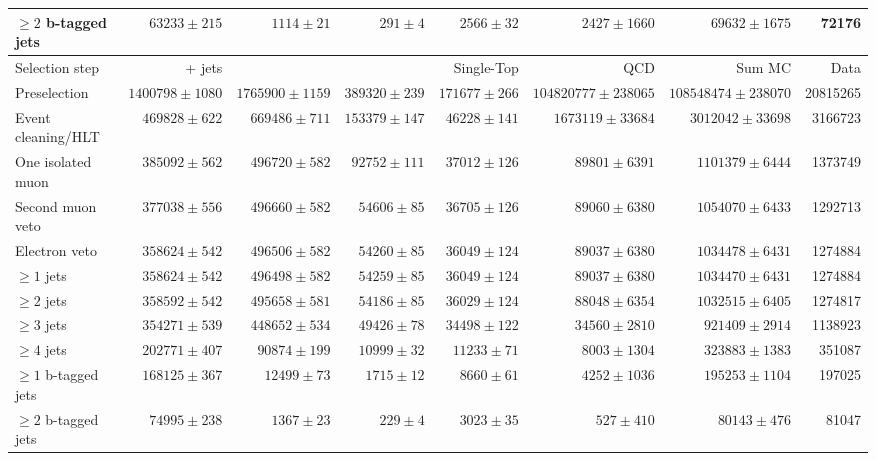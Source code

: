\begin{table}
{\begin{tabular}{lrrrrrrr}
	$\geq 2$ b-tagged jets  &  $63233 \pm 215$ &  $1114 \pm 21$ &  $291 \pm 4$ &  $2566 \pm 32$ &  $2427 \pm 1660$ &  $69632 \pm 1675$ &  72176 \\ 
	\hline
	\hline
	Selection step & \ttbar + jets & \WpJets & \ZpJets & Single-Top & QCD & Sum MC & Data \\
	\hline
	Preselection  &  $1400798 \pm 1080$ &  $1765900 \pm 1159$ &  $389320 \pm 239$ &  $171677 \pm 266$ &  $104820777 \pm 238065$ &  $108548474 \pm 238070$ &  20815265 \\ 
	Event cleaning/HLT  &  $469828 \pm 622$ &  $669486 \pm 711$ &  $153379 \pm 147$ &  $46228 \pm 141$ &  $1673119 \pm 33684$ &  $3012042 \pm 33698$ &  3166723 \\ 
	One isolated muon  &  $385092 \pm 562$ &  $496720 \pm 582$ &  $92752 \pm 111$ &  $37012 \pm 126$ &  $89801 \pm 6391$ &  $1101379 \pm 6444$ &  1373749 \\ 
	Second muon veto  &  $377038 \pm 556$ &  $496660 \pm 582$ &  $54606 \pm 85$ &  $36705 \pm 126$ &  $89060 \pm 6380$ &  $1054070 \pm 6433$ &  1292713 \\ 
	Electron veto  &  $358624 \pm 542$ &  $496506 \pm 582$ &  $54260 \pm 85$ &  $36049 \pm 124$ &  $89037 \pm 6380$ &  $1034478 \pm 6431$ &  1274884 \\ 
	$\geq 1$ jets  &  $358624 \pm 542$ &  $496498 \pm 582$ &  $54259 \pm 85$ &  $36049 \pm 124$ &  $89037 \pm 6380$ &  $1034470 \pm 6431$ &  1274884 \\ 
	$\geq 2$ jets  &  $358592 \pm 542$ &  $495658 \pm 581$ &  $54186 \pm 85$ &  $36029 \pm 124$ &  $88048 \pm 6354$ &  $1032515 \pm 6405$ &  1274817 \\ 
	$\geq 3$ jets  &  $354271 \pm 539$ &  $448652 \pm 534$ &  $49426 \pm 78$ &  $34498 \pm 122$ &  $34560 \pm 2810$ &  $921409 \pm 2914$ &  1138923 \\ 
	$\geq 4$ jets  &  $202771 \pm 407$ &  $90874 \pm 199$ &  $10999 \pm 32$ &  $11233 \pm 71$ &  $8003 \pm 1304$ &  $323883 \pm 1383$ &  351087 \\ 
	$\geq 1$ b-tagged jets  &  $168125 \pm 367$ &  $12499 \pm 73$ &  $1715 \pm 12$ &  $8660 \pm 61$ &  $4252 \pm 1036$ &  $195253 \pm 1104$ &  197025 \\ 
	$\geq 2$ b-tagged jets  &  $74995 \pm 238$ &  $1367 \pm 23$ &  $229 \pm 4$ &  $3023 \pm 35$ &  $527 \pm 410$ &  $80143 \pm 476$ &  81047 \\
	\hline
	\hline
    \end{tabular}
    }
\end{table}

